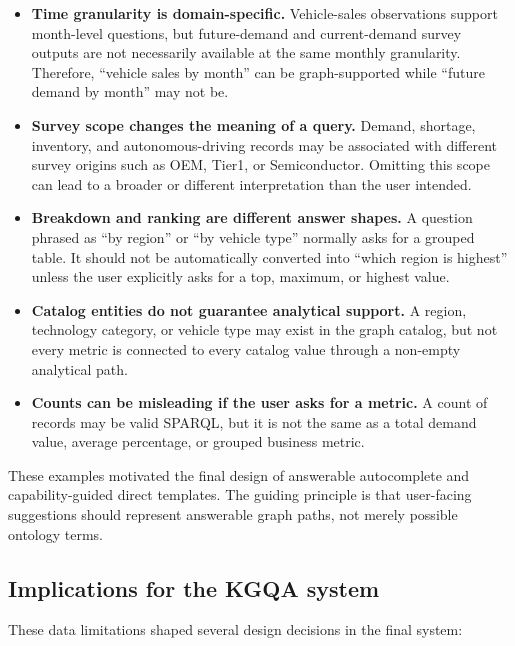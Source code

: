 \documentclass[
  12pt,
  english,
  oneside]{report}
\begin{document}
\begin{itemize}
    \item \textbf{Time granularity is domain-specific.} Vehicle-sales observations support month-level questions, but future-demand and current-demand survey outputs are not necessarily available at the same monthly granularity. Therefore, ``vehicle sales by month'' can be graph-supported while ``future demand by month'' may not be.
    \item \textbf{Survey scope changes the meaning of a query.} Demand, shortage, inventory, and autonomous-driving records may be associated with different survey origins such as OEM, Tier1, or Semiconductor. Omitting this scope can lead to a broader or different interpretation than the user intended.
    \item \textbf{Breakdown and ranking are different answer shapes.} A question phrased as ``by region'' or ``by vehicle type'' normally asks for a grouped table. It should not be automatically converted into ``which region is highest'' unless the user explicitly asks for a top, maximum, or highest value.
    \item \textbf{Catalog entities do not guarantee analytical support.} A region, technology category, or vehicle type may exist in the graph catalog, but not every metric is connected to every catalog value through a non-empty analytical path.
    \item \textbf{Counts can be misleading if the user asks for a metric.} A count of records may be valid SPARQL, but it is not the same as a total demand value, average percentage, or grouped business metric.
\end{itemize}

These examples motivated the final design of answerable autocomplete and capability-guided direct templates. The guiding principle is that user-facing suggestions should represent answerable graph paths, not merely possible ontology terms.

\subsection{Implications for the KGQA system}

These data limitations shaped several design decisions in the final system:
\end{document}
